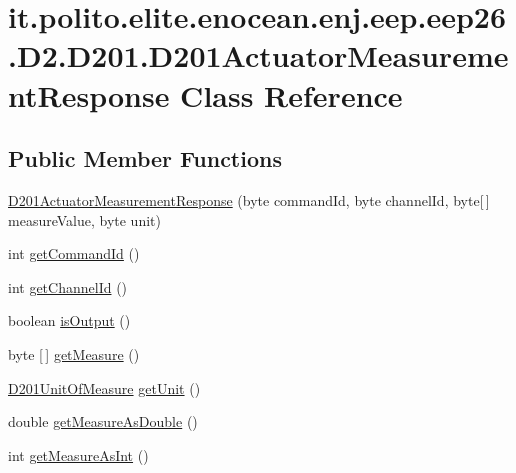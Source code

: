 \hypertarget{classit_1_1polito_1_1elite_1_1enocean_1_1enj_1_1eep_1_1eep26_1_1_d2_1_1_d201_1_1_d201_actuator_measurement_response}{}\section{it.\+polito.\+elite.\+enocean.\+enj.\+eep.\+eep26.\+D2.\+D201.\+D201\+Actuator\+Measurement\+Response Class Reference}
\label{classit_1_1polito_1_1elite_1_1enocean_1_1enj_1_1eep_1_1eep26_1_1_d2_1_1_d201_1_1_d201_actuator_measurement_response}
\subsection*{Public Member Functions}
\begin{DoxyCompactItemize}
\item 
\hyperlink{classit_1_1polito_1_1elite_1_1enocean_1_1enj_1_1eep_1_1eep26_1_1_d2_1_1_d201_1_1_d201_actuator_measurement_response_a20227da51cd2cee59969145e22c9ae0e}{D201\+Actuator\+Measurement\+Response} (byte command\+Id, byte channel\+Id, byte\mbox{[}$\,$\mbox{]} measure\+Value, byte unit)
\item 
int \hyperlink{classit_1_1polito_1_1elite_1_1enocean_1_1enj_1_1eep_1_1eep26_1_1_d2_1_1_d201_1_1_d201_actuator_measurement_response_ad314ee1f03120d99344b1e79a2fae21a}{get\+Command\+Id} ()
\item 
int \hyperlink{classit_1_1polito_1_1elite_1_1enocean_1_1enj_1_1eep_1_1eep26_1_1_d2_1_1_d201_1_1_d201_actuator_measurement_response_ab1c28956fcf3a7755c0e55c00903bb63}{get\+Channel\+Id} ()
\item 
boolean \hyperlink{classit_1_1polito_1_1elite_1_1enocean_1_1enj_1_1eep_1_1eep26_1_1_d2_1_1_d201_1_1_d201_actuator_measurement_response_ae2dbbacc1768478d690261f1550c9322}{is\+Output} ()
\item 
byte \mbox{[}$\,$\mbox{]} \hyperlink{classit_1_1polito_1_1elite_1_1enocean_1_1enj_1_1eep_1_1eep26_1_1_d2_1_1_d201_1_1_d201_actuator_measurement_response_af764691731b90a772ab2c5a941cb2586}{get\+Measure} ()
\item 
\hyperlink{enumit_1_1polito_1_1elite_1_1enocean_1_1enj_1_1eep_1_1eep26_1_1_d2_1_1_d201_1_1_d201_unit_of_measure}{D201\+Unit\+Of\+Measure} \hyperlink{classit_1_1polito_1_1elite_1_1enocean_1_1enj_1_1eep_1_1eep26_1_1_d2_1_1_d201_1_1_d201_actuator_measurement_response_acf0cc04998f9354ab37e00a7bd10ff14}{get\+Unit} ()
\item 
double \hyperlink{classit_1_1polito_1_1elite_1_1enocean_1_1enj_1_1eep_1_1eep26_1_1_d2_1_1_d201_1_1_d201_actuator_measurement_response_ab8318f431b1b9f25e62c160adb0d72fc}{get\+Measure\+As\+Double} ()
\item 
int \hyperlink{classit_1_1polito_1_1elite_1_1enocean_1_1enj_1_1eep_1_1eep26_1_1_d2_1_1_d201_1_1_d201_actuator_measurement_response_ac9c226fb78f0b6fd30a0e4dd7daf32ac}{get\+Measure\+As\+Int} ()
\end{DoxyCompactItemize}


